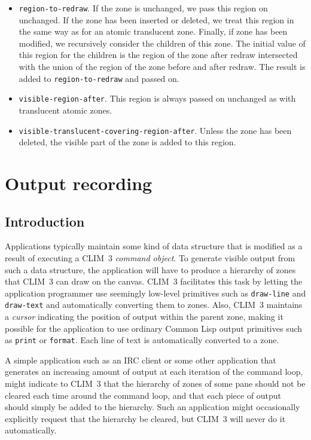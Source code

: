 \documentclass{report}
\def\cl{Common Lisp}
\def\clim{CLIM~3}
\def\code#1{\texttt{#1}}
\begin{document}
\begin{itemize}
\item \texttt{region-to-redraw}.  If the zone is unchanged, we pass
  this region on unchanged.  If the zone has been inserted or
  deleted, we treat this region in the same way as for an atomic
  translucent zone.  Finally, if zone has been modified, we
  recursively consider the children of this zone.  The initial value
  of this region for the children is the region of the zone after
  redraw intersected with the union of the region of the zone
  before and after redraw.  The result is added to
  \texttt{region-to-redraw} and passed on.
\item \texttt{visible-region-after}.  This region is always passed on
  unchanged as with translucent atomic zones. 
\item \texttt{visible-translucent-covering-region-after}.  Unless the
  zone has been deleted, the visible part of the zone is added to
  this region.
\end{itemize}

\chapter{Output recording}

\section{Introduction}

Applications typically maintain some kind of data structure that is
modified as a result of executing a \clim{} \emph{command object}.  To
generate visible output from such a data structure, the application
will have to produce a hierarchy of zones that \clim{} can draw on
the canvas.  \clim{} facilitates this task by letting the application
programmer use seemingly low-level primitives such as \code{draw-line}
and \code{draw-text} and automatically converting them to zones.
Also, \clim{} maintains a \emph{cursor} indicating the position of
output within the parent zone, making it possible for the
application to use ordinary \cl{} output primitives such as
\code{print} or \code{format}.  Each line of text is automatically
converted to a zone. 

A simple application such as an IRC client or some other application
that generates an increasing amount of output at each iteration of the
command loop, might indicate to \clim{} that the hierarchy of zones
of some pane should not be cleared each time around the command loop,
and that each piece of output should simply be added to the
hierarchy.  Such an application might occasionally explicitly request
that the hierarchy be cleared, but \clim{} will never do it
automatically. 
\end{document}
